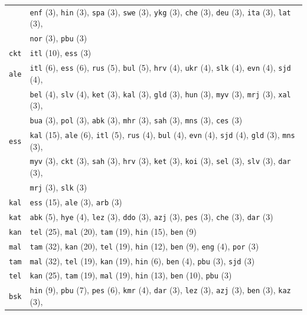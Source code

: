 \begin{center}
\begin{longtable}{ll}
 & \texttt{enf} (3), \texttt{hin} (3), \texttt{spa} (3), \texttt{swe} (3), \texttt{ykg} (3), \texttt{che} (3), \texttt{deu} (3), \texttt{ita} (3), \texttt{lat} (3), \\
 & \texttt{nor} (3), \texttt{pbu} (3) \\
\texttt{ckt} & \texttt{itl} (10), \texttt{ess} (3) \\
\texttt{ale} & \texttt{itl} (6), \texttt{ess} (6), \texttt{rus} (5), \texttt{bul} (5), \texttt{hrv} (4), \texttt{ukr} (4), \texttt{slk} (4), \texttt{evn} (4), \texttt{sjd} (4), \\
 & \texttt{bel} (4), \texttt{slv} (4), \texttt{ket} (3), \texttt{kal} (3), \texttt{gld} (3), \texttt{hun} (3), \texttt{myv} (3), \texttt{mrj} (3), \texttt{xal} (3), \\
 & \texttt{bua} (3), \texttt{pol} (3), \texttt{abk} (3), \texttt{mhr} (3), \texttt{sah} (3), \texttt{mns} (3), \texttt{ces} (3) \\
\texttt{ess} & \texttt{kal} (15), \texttt{ale} (6), \texttt{itl} (5), \texttt{rus} (4), \texttt{bul} (4), \texttt{evn} (4), \texttt{sjd} (4), \texttt{gld} (3), \texttt{mns} (3), \\
 & \texttt{myv} (3), \texttt{ckt} (3), \texttt{sah} (3), \texttt{hrv} (3), \texttt{ket} (3), \texttt{koi} (3), \texttt{sel} (3), \texttt{slv} (3), \texttt{dar} (3), \\
 & \texttt{mrj} (3), \texttt{slk} (3) \\
\texttt{kal} & \texttt{ess} (15), \texttt{ale} (3), \texttt{arb} (3) \\
\texttt{kat} & \texttt{abk} (5), \texttt{hye} (4), \texttt{lez} (3), \texttt{ddo} (3), \texttt{azj} (3), \texttt{pes} (3), \texttt{che} (3), \texttt{dar} (3) \\
\texttt{kan} & \texttt{tel} (25), \texttt{mal} (20), \texttt{tam} (19), \texttt{hin} (15), \texttt{ben} (9) \\
\texttt{mal} & \texttt{tam} (32), \texttt{kan} (20), \texttt{tel} (19), \texttt{hin} (12), \texttt{ben} (9), \texttt{eng} (4), \texttt{por} (3) \\
\texttt{tam} & \texttt{mal} (32), \texttt{tel} (19), \texttt{kan} (19), \texttt{hin} (6), \texttt{ben} (4), \texttt{pbu} (3), \texttt{sjd} (3) \\
\texttt{tel} & \texttt{kan} (25), \texttt{tam} (19), \texttt{mal} (19), \texttt{hin} (13), \texttt{ben} (10), \texttt{pbu} (3) \\
\texttt{bsk} & \texttt{hin} (9), \texttt{pbu} (7), \texttt{pes} (6), \texttt{kmr} (4), \texttt{dar} (3), \texttt{lez} (3), \texttt{azj} (3), \texttt{ben} (3), \texttt{kaz} (3), \\

\end{longtable}
\end{center}
